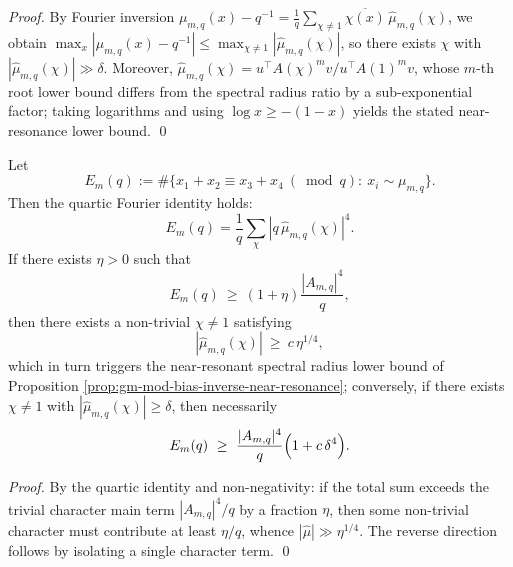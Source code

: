 \begin{proof}
By Fourier inversion
\(
\mu_{m,q}(x)-q^{-1}=\frac{1}{q}\sum_{\chi\ne 1}\overline{\chi(x)}\,\widehat\mu_{m,q}(\chi)
\),
we obtain \(\max_x|\mu_{m,q}(x)-q^{-1}|\le \max_{\chi\ne 1}|\widehat\mu_{m,q}(\chi)|\), so there exists \(\chi\) with \(|\widehat\mu_{m,q}(\chi)|\gg \delta\).
Moreover, \(\widehat\mu_{m,q}(\chi)=u^\top A(\chi)^m v/u^\top A(1)^m v\), whose \(m\)-th root lower bound differs from the spectral radius ratio by a sub-exponential factor; taking logarithms and using \(\log x\ge - (1-x)\) yields the stated near-resonance lower bound. \qed
\end{proof}

\begin{proposition}\label{prop:gm-mod-additive-energy-inverse}
Let
\[
E_m(q):=\#\{x_1+x_2\equiv x_3+x_4\ (\bmod q):\ x_i\sim\mu_{m,q}\}.
\]
Then the quartic Fourier identity holds:
\[
E_m(q)=\frac{1}{q}\sum_{\chi}|q\,\widehat\mu_{m,q}(\chi)|^4.
\]
If there exists \(\eta>0\) such that
\[
E_m(q)\ \ge\ (1+\eta)\frac{|A_{m,q}|^4}{q},
\]
then there exists a non-trivial \(\chi\neq 1\) satisfying
\[
|\widehat\mu_{m,q}(\chi)|\ \ge\ c\,\eta^{1/4},
\]
which in turn triggers the near-resonant spectral radius lower bound of Proposition \ref{prop:gm-mod-bias-inverse-near-resonance}; conversely, if there exists \(\chi\neq 1\) with \(|\widehat\mu_{m,q}(\chi)|\ge \delta\), then necessarily
\[
E_m(q)\ \ge\ \frac{|A_{m,q}|^4}{q}\Bigl(1+c\,\delta^4\Bigr).
\]
\end{proposition}

\begin{proof}
By the quartic identity and non-negativity: if the total sum exceeds the trivial character main term \(|A_{m,q}|^4/q\) by a fraction \(\eta\), then some non-trivial character must contribute at least \(\eta/q\), whence \(|\widehat\mu|\gg \eta^{1/4}\).
The reverse direction follows by isolating a single character term. \qed
\end{proof}

